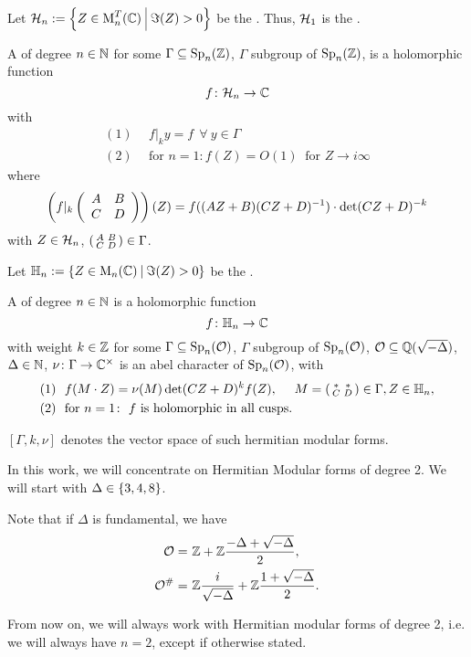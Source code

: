 Let $\SiegelHalfPlane_n := \Set{Z \in \M_n^T(\C)}{\Im(Z) > 0}$ be the .
Thus, $\mathcal{H}_1$ is the .


A  of degree $n\in\mathbb{N}$ for some $\Gamma \subseteq \operatorname{Sp}_n(\mathbb{Z})$, $\Gamma$ subgroup of $\operatorname{Sp}_n(\mathbb{Z})$, is a holomorphic function
\[ f \colon \mathcal{H}_n \rightarrow \mathbb{C} \]
with
\begin{align*}
(1) \ \ & f |_k y = f \ \ \forall \ y \in \Gamma \\
(2) \ \ & \text{for } n = 1 \colon f(Z) = O(1) \ \text{ for } Z \rightarrow i \infty
\end{align*}
where
\[ \left( f|_k \left( \begin{array}{cc} A & B \\ C & D \end{array} \right) \right) (Z) =
f((AZ + B)(CZ + D)^{-1}) \cdot \det(CZ + D)^{-k} \]
with $Z \in \mathcal{H}_n$, $\left( \begin{smallmatrix} A & B \\ C & D \end{smallmatrix} \right) \in \Gamma$.

Let $\HalfPlane_n :=  \Set{ Z \in \M_n(\C) }{ \Im(Z) > 0}$ be the .

A  of degree $n\in\mathbb{N}$
is a holomorphic function
\[ f \colon \mathbb{H}_n \rightarrow \mathbb{C} \]
with weight $k\in \mathbb{Z}$ for some $\Gamma \subseteq \operatorname{Sp}_n(\mathcal{O})$, $\Gamma$ subgroup of $\operatorname{Sp}_n(\mathcal{O})$, $\mathcal{O} \subseteq \mathbb{Q}(\sqrt{-\Delta})$, $\Delta \in \mathbb{N}$, $\nu \colon \Gamma \rightarrow \mathbb{C}^\times$ is an abel character of $\operatorname{Sp}_n(\mathcal{O})$, with
\begin{align*}
(1) \ \ & f(M \cdot Z) = \nu(M) \det(CZ + D)^k f(Z), \ \ \ \ M = \left( \begin{smallmatrix} * & * \\ C & D \end{smallmatrix} \right) \in \Gamma, Z \in \mathbb{H}_n , \\
(2) \ \ & \text{for } n = 1 \colon \ \text{$f$ is holomorphic in all cusps} .
\end{align*}

$[\Gamma, k, \nu]$ denotes the vector space of such hermitian modular forms.

In this work, we will concentrate on Hermitian Modular forms of degree 2. We will start with $\Delta \in \Set{3,4,8}$.

Note that if $\Delta$ is fundamental, we have
\begin{align*}
\mathcal{O} = &\ \mathbb{Z} +  \mathbb{Z} \frac{-\Delta+\sqrt{-\Delta}}{2} , \\
\mathcal{O}^\# = & \ \mathbb{Z} \frac{i}{\sqrt{-\Delta}} + \mathbb{Z} \frac{1 + \sqrt{-\Delta}}{2} .
\end{align*}

From now on, we will always work with Hermitian modular forms of degree 2, i.e. we will always have $n=2$, except if otherwise stated.


